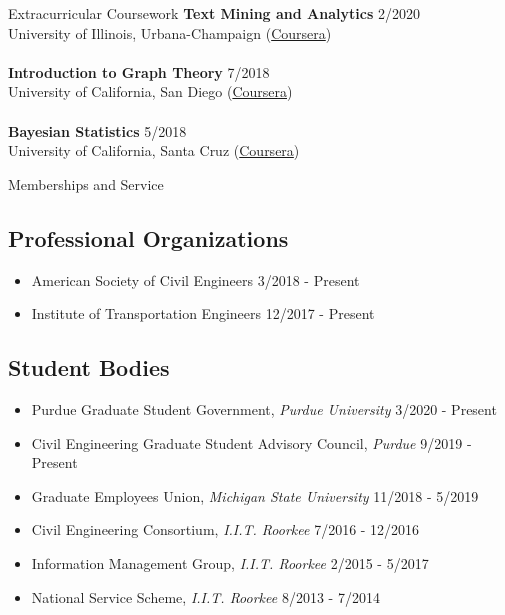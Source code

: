 \documentclass{resume} %
\begin{document}
    \begin{rSection}{Extracurricular Coursework}
        \textbf{Text Mining and Analytics} \hfill 2/2020
        \\ University of Illinois, Urbana-Champaign (\href{https://coursera.org/share/7eac25e880771bf576b661324a4d79be}{Coursera}) \\
        \\ \textbf{Introduction to Graph Theory} \hfill 7/2018
        \\ University of California, San Diego (\href{https://coursera.org/share/97583460aa0510f570f971844f19d16b}{Coursera}) \\
        \\ \textbf{Bayesian Statistics} \hfill 5/2018
        \\ University of California, Santa Cruz (\href{https://coursera.org/share/8d0b0387400c53f13a7ce2b2b81153fc}{Coursera})
    \end{rSection}

    \begin{rSection}{Memberships and Service}
        \subsection*{Professional Organizations}
        \begin{itemize}
            \item American Society of Civil Engineers \hfill 3/2018 - Present
            \item Institute of Transportation Engineers \hfill 12/2017 - Present
        \end{itemize}
        \subsection*{Student Bodies}
        \begin{itemize}
            \item Purdue Graduate Student Government, \textit{Purdue University} \hfill 3/2020 - Present
            \item Civil Engineering Graduate Student Advisory Council, \textit{Purdue} \hfill 9/2019 - Present
            \item Graduate Employees Union, \textit{Michigan State University} \hfill 11/2018 - 5/2019
            \item Civil Engineering Consortium, \textit{I.I.T. Roorkee} \hfill 7/2016 - 12/2016
            \item Information Management Group, \textit{I.I.T. Roorkee} \hfill 2/2015 - 5/2017
            \item National Service Scheme, \textit{I.I.T. Roorkee} \hfill 8/2013 - 7/2014
        \end{itemize}
    \end{rSection}
\end{document}
